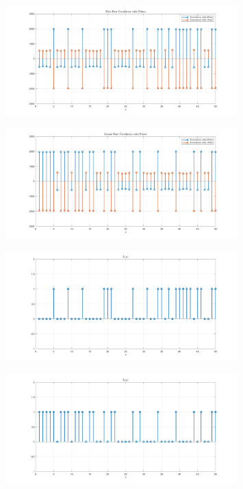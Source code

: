 \documentclass[a4paper]{article}
\begin{document}
	\begin{figure}[H]
		\includegraphics[width=0.8\textwidth]{comsys_fig43.png}\\ 
		\centering
	\end{figure}
	\begin{figure}[H]
		\includegraphics[width=0.8\textwidth]{comsys_fig44.png}\\ 
		\centering
	\end{figure}
	\begin{figure}[H]
		\includegraphics[width=0.8\textwidth]{comsys_fig45.png}\\ 
		\centering
	\end{figure}
	\begin{figure}[H]
		\includegraphics[width=0.8\textwidth]{comsys_fig46.png}\\ 
		\centering
	\end{figure}
\end{document}
